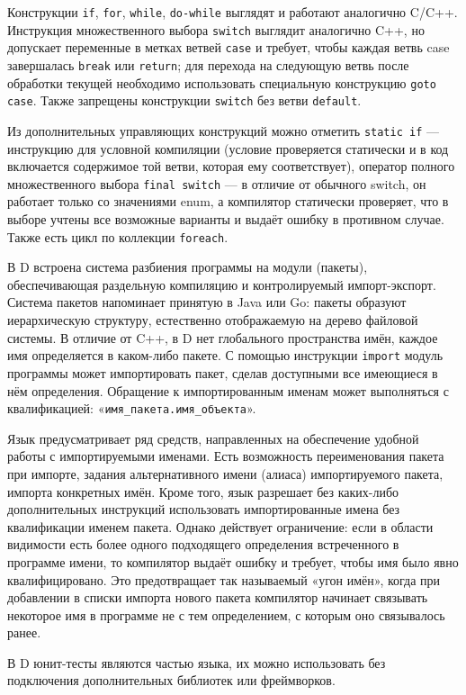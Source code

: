 \documentclass{studrep}
\begin{document}
Конструкции \texttt{if}, \texttt{for}, \texttt{while}, \texttt{do-while} выглядят и работают аналогично C/C++. Инструкция множественного выбора \texttt{switch} выглядит аналогично C++, но допускает переменные в метках ветвей \texttt{case} и требует, чтобы каждая ветвь case завершалась \texttt{break} или \texttt{return}; для перехода на следующую ветвь после обработки текущей необходимо использовать специальную конструкцию \texttt{goto case}. Также запрещены конструкции \texttt{switch} без ветви \texttt{default}.

Из дополнительных управляющих конструкций можно отметить \texttt{static if} — инструкцию для условной компиляции (условие проверяется статически и в код включается содержимое той ветви, которая ему соответствует), оператор полного множественного выбора \texttt{final switch} — в отличие от обычного switch, он работает только со значениями enum, а компилятор статически проверяет, что в выборе учтены все возможные варианты и выдаёт ошибку в противном случае. Также есть цикл по коллекции \texttt{foreach}.

В D встроена система разбиения программы на модули (пакеты), обеспечивающая раздельную компиляцию и контролируемый импорт-экспорт. Система пакетов напоминает принятую в Java или Go: пакеты образуют иерархическую структуру, естественно отображаемую на дерево файловой системы. В отличие от C++, в D нет глобального пространства имён, каждое имя определяется в каком-либо пакете. С помощью инструкции \texttt{import} модуль программы может импортировать пакет, сделав доступными все имеющиеся в нём определения. Обращение к импортированным именам может выполняться с квалификацией: «\texttt{имя\_пакета.имя\_объекта}».

Язык предусматривает ряд средств, направленных на обеспечение удобной работы с импортируемыми именами. Есть возможность переименования пакета при импорте, задания альтернативного имени (алиаса) импортируемого пакета, импорта конкретных имён. Кроме того, язык разрешает без каких-либо дополнительных инструкций использовать импортированные имена без квалификации именем пакета. Однако действует ограничение: если в области видимости есть более одного подходящего определения встреченного в программе имени, то компилятор выдаёт ошибку и требует, чтобы имя было явно квалифицировано. Это предотвращает так называемый «угон имён», когда при добавлении в списки импорта нового пакета компилятор начинает связывать некоторое имя в программе не с тем определением, с которым оно связывалось ранее.

В D юнит-тесты являются частью языка, их можно использовать без подключения дополнительных библиотек или фреймворков.
\end{document}
